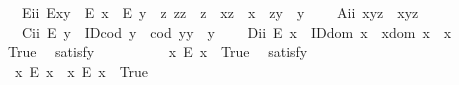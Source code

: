 \begin{isabellebody}
\ \ \ E\isactrlsub i\isactrlsub i{\isacharcolon}\ {\isachardoublequoteopen}E{\isacharparenleft}x{\isasymcdot}y{\isacharparenright}\ \isactrlbold {\isasymleftarrow}\ {\isacharparenleft}E\ x\ \isactrlbold {\isasymand}\ E\ y\ \isactrlbold {\isasymand}\ {\isacharparenleft}\isactrlbold {\isasymexists}z{\isachardot}\ z{\isasymcdot}z\ {\isasymcong}\ z\ \isactrlbold {\isasymand}\ x{\isasymcdot}z\ {\isasymcong}\ x\ \isactrlbold {\isasymand}\ z{\isasymcdot}y\ {\isasymcong}\ y{\isacharparenright}{\isacharparenright}{\isachardoublequoteclose}\ \isanewline
\ \ \ A\isactrlsub i\isactrlsub i{\isacharcolon}\ {\isachardoublequoteopen}x{\isasymcdot}{\isacharparenleft}y{\isasymcdot}z{\isacharparenright}\ {\isasymcong}\ {\isacharparenleft}x{\isasymcdot}y{\isacharparenright}{\isasymcdot}z{\isachardoublequoteclose}\ \isanewline
\ \ \ C\isactrlsub i\isactrlsub i{\isacharcolon}\ {\isachardoublequoteopen}E\ y\ \isactrlbold {\isasymrightarrow}\ {\isacharparenleft}ID{\isacharparenleft}cod\ y{\isacharparenright}\ \isactrlbold {\isasymand}\ {\isacharparenleft}cod\ y{\isacharparenright}{\isasymcdot}y\ {\isasymcong}\ y{\isacharparenright}{\isachardoublequoteclose}\ \isanewline
\ \ \ D\isactrlsub i\isactrlsub i{\isacharcolon}\ {\isachardoublequoteopen}E\ x\ \isactrlbold {\isasymrightarrow}\ {\isacharparenleft}ID{\isacharparenleft}dom\ x{\isacharparenright}\ \isactrlbold {\isasymand}\ x{\isasymcdot}{\isacharparenleft}dom\ x{\isacharparenright}\ {\isasymcong}\ x{\isacharparenright}{\isachardoublequoteclose}\ \isanewline
\ \ \isanewline
\ \ \ \isamarkupfalse%
\ True\ \isamarkupfalse%
\ {\isacharbrackleft}satisfy{\isacharbrackright}%
\isadelimproof
\ %
\endisadelimproof
%
\isatagproof
{}\isamarkupfalse%
\ \ %
%
\endisatagproof
{\isafoldproof}%
%
\isadelimproof
%
\endisadelimproof
\isanewline
\ \ \ \isamarkupfalse%
\ \ {\isachardoublequoteopen}{\isasymexists}x{\isachardot}\ \isactrlbold {\isasymnot}{\isacharparenleft}E\ x{\isacharparenright}{\isachardoublequoteclose}\ \ True\ \isamarkupfalse%
\ {\isacharbrackleft}satisfy{\isacharbrackright}%
\isadelimproof
\ %
\endisadelimproof
%
\isatagproof
{}\isamarkupfalse%
\ \ %
%
\endisatagproof
{\isafoldproof}%
%
\isadelimproof
%
\endisadelimproof
\isanewline
\ \ \ \isamarkupfalse%
\ \ {\isachardoublequoteopen}{\isacharparenleft}{\isasymexists}x{\isachardot}\ \isactrlbold {\isasymnot}{\isacharparenleft}E\ x{\isacharparenright}{\isacharparenright}\ {\isasymand}\ {\isacharparenleft}{\isasymexists}x{\isachardot}\ {\isacharparenleft}E\ x{\isacharparenright}{\isacharparenright}{\isachardoublequoteclose}\ \ True\ \isamarkupfalse%

\end{isabellebody}

